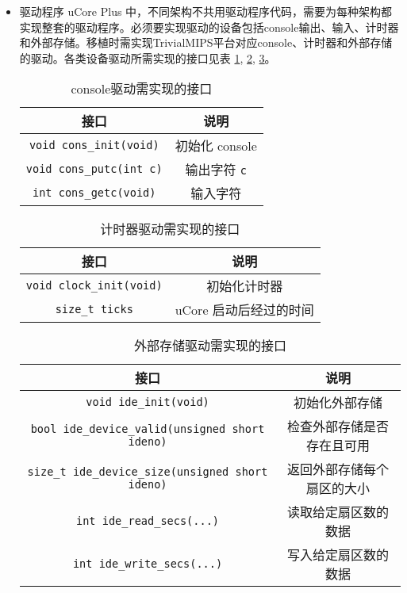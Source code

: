 \begin{itemize}
\item{驱动程序}
uCore Plus 中，不同架构不共用驱动程序代码，需要为每种架构都实现整套的驱动程序。必须要实现驱动的设备包括console输出、输入、计时器和外部存储。移植时需实现TrivialMIPS平台对应console、计时器和外部存储的驱动。各类设备驱动所需实现的接口见表 \ref{table:console_driver_interface}, \ref{table:timer_driver_interface}, \ref{table:ide_driver_interface}。

\begin{table}[!htbp]
\centering
\begin{tabular}{|c|c|}
\hline
\textbf{接口}                                      & \textbf{说明}                      \\ \hline
\texttt{void cons\_init(void)}  & 初始化 console                      \\ \hline
\texttt{void cons\_putc(int c)} & 输出字符 \texttt{c} \\ \hline
\texttt{int cons\_getc(void)}   & 输入字符                             \\ \hline
\end{tabular}
    \caption{console驱动需实现的接口}
    \label{table:console_driver_interface}
\end{table}


\begin{table}[!htbp]
\centering
\begin{tabular}{|c|c|}
\hline
\textbf{接口}                                      & \textbf{说明}                      \\ \hline
\texttt{void clock\_init(void)}  & 初始化计时器                      \\ \hline
\texttt{size\_t ticks}   & uCore 启动后经过的时间                             \\ \hline
\end{tabular}
    \caption{计时器驱动需实现的接口}
    \label{table:timer_driver_interface}
\end{table}

\begin{table}[!htbp]
\centering
\begin{tabular}{|c|c|}
\hline
\textbf{接口}                                      & \textbf{说明}                      \\ \hline
\texttt{void ide\_init(void)}  & 初始化外部存储                      \\ \hline
\texttt{bool ide\_device\_valid(unsigned short ideno)}   & 检查外部存储是否存在且可用                             \\ \hline
\texttt{size\_t ide\_device\_size(unsigned short ideno)}   & 返回外部存储每个扇区的大小                             \\ \hline
\texttt{int ide\_read\_secs(...)}   & 读取给定扇区数的数据                             \\ \hline
\texttt{int ide\_write\_secs(...)}   & 写入给定扇区数的数据                             \\ \hline
\end{tabular}
    \caption{外部存储驱动需实现的接口}
    \label{table:ide_driver_interface}
\end{table}


\end{itemize}
